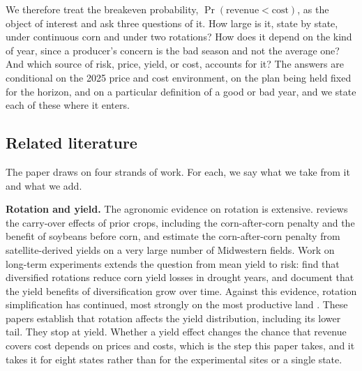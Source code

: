 \documentclass[11pt,letterpaper]{article}
\theoremstyle{remark}
\begin{document}
We therefore treat the breakeven probability, $\Pr(\text{revenue}<\text{cost})$, as the object of interest and ask three questions of it. How large is it, state by state, under continuous corn and under two rotations? How does it depend on the kind of year, since a producer's concern is the bad season and not the average one? And which source of risk, price, yield, or cost, accounts for it? The answers are conditional on the 2025 price and cost environment, on the plan being held fixed for the horizon, and on a particular definition of a good or bad year, and we state each of these where it enters.

\subsection{Related literature}

The paper draws on four strands of work. For each, we say what we take from it and what we add.

\textbf{Rotation and yield.} The agronomic evidence on rotation is extensive. \citet{Bullock1992} reviews the carry-over effects of prior crops, including the corn-after-corn penalty and the benefit of soybeans before corn, and \citet{Seifert2017} estimate the corn-after-corn penalty from satellite-derived yields on a very large number of Midwestern fields. Work on long-term experiments extends the question from mean yield to risk: \citet{Bowles2020} find that diversified rotations reduce corn yield losses in drought years, and \citet{Smith2023} document that the yield benefits of diversification grow over time. Against this evidence, rotation simplification has continued, most strongly on the most productive land \citep{socolar2021}. These papers establish that rotation affects the yield distribution, including its lower tail. They stop at yield. Whether a yield effect changes the chance that revenue covers cost depends on prices and costs, which is the step this paper takes, and it takes it for eight states rather than for the experimental sites or a single state.
\end{document}
